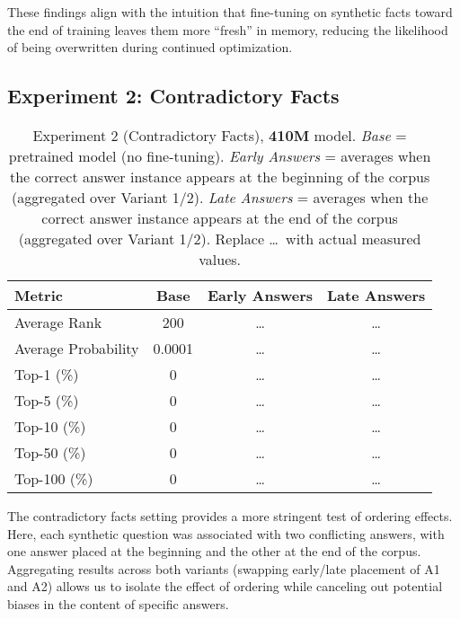 \documentclass[11pt]{article}
\begin{document}
These findings align with the intuition that fine-tuning on synthetic facts toward the end of training leaves them more “fresh” in memory, reducing the likelihood of being overwritten during continued optimization.

\subsection{Experiment 2: Contradictory Facts}
\begin{table*}[htbp]
\centering
\small
\begin{tabular}{l|ccc}
\hline
\textbf{Metric} & \textbf{Base} & \textbf{Early Answers} & \textbf{Late Answers} \\
\hline
Average Rank            & 200      & \dots    & \dots    \\
Average Probability     & 0.0001   & \dots    & \dots    \\
Top-1 (\%)              & 0        & \dots    & \dots    \\
Top-5 (\%)              & 0        & \dots    & \dots    \\
Top-10 (\%)             & 0        & \dots    & \dots    \\
Top-50 (\%)             & 0        & \dots    & \dots    \\
Top-100 (\%)            & 0        & \dots    & \dots    \\
\hline
\end{tabular}
\caption{Experiment 2 (Contradictory Facts), \textbf{410M} model.
\emph{Base} = pretrained model (no fine-tuning).
\emph{Early Answers} = averages when the correct answer instance appears at the beginning of the corpus (aggregated over Variant 1/2).
\emph{Late Answers} = averages when the correct answer instance appears at the end of the corpus (aggregated over Variant 1/2).
Replace \dots\ with actual measured values.}
\label{tab:contradict-410m}
\end{table*}

The contradictory facts setting provides a more stringent test of ordering effects. Here, each synthetic question was associated with two conflicting answers, with one answer placed at the beginning and the other at the end of the corpus. Aggregating results across both variants (swapping early/late placement of A1 and A2) allows us to isolate the effect of ordering while canceling out potential biases in the content of specific answers.
\end{document}
